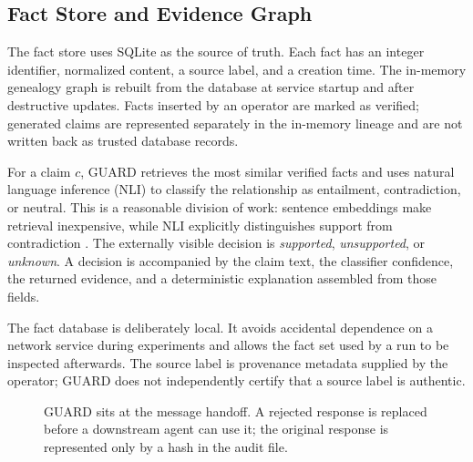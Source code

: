 \documentclass[journal]{IEEEtran}
\begin{document}
\subsection{Fact Store and Evidence Graph}

The fact store uses SQLite as the source of truth. Each fact has an integer identifier, normalized content, a source label, and a creation time. The in-memory genealogy graph is rebuilt from the database at service startup and after destructive updates. Facts inserted by an operator are marked as verified; generated claims are represented separately in the in-memory lineage and are not written back as trusted database records.

For a claim $c$, GUARD retrieves the most similar verified facts and uses natural language inference (NLI) to classify the relationship as entailment, contradiction, or neutral. This is a reasonable division of work: sentence embeddings make retrieval inexpensive, while NLI explicitly distinguishes support from contradiction \cite{multinli,sbert}. The externally visible decision is \emph{supported}, \emph{unsupported}, or \emph{unknown}. A decision is accompanied by the claim text, the classifier confidence, the returned evidence, and a deterministic explanation assembled from those fields.

The fact database is deliberately local. It avoids accidental dependence on a network service during experiments and allows the fact set used by a run to be inspected afterwards. The source label is provenance metadata supplied by the operator; GUARD does not independently certify that a source label is authentic.

\begin{figure}[t]
\centering
{}
\caption{GUARD sits at the message handoff. A rejected response is replaced before a downstream agent can use it; the original response is represented only by a hash in the audit file.}
\label{fig:guard-flow}
\end{figure}
\end{document}
